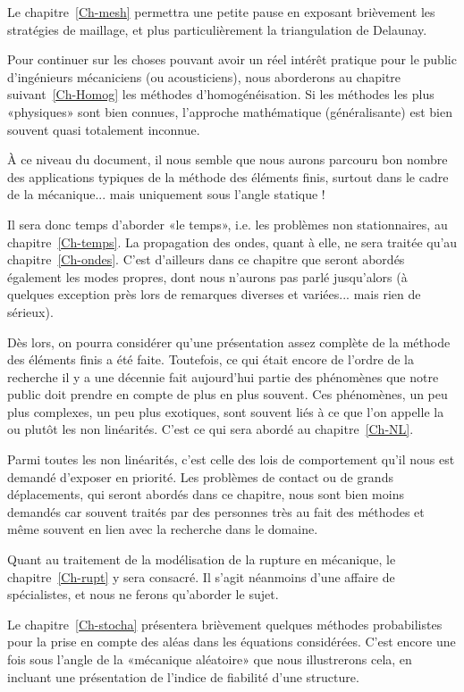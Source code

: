 \medskip
Le chapitre~\ref{Ch-mesh} permettra une petite pause en exposant brièvement les stratégies de maillage, et plus particulièrement la triangulation de Delaunay.

\medskip
Pour continuer sur les choses pouvant avoir un réel intérêt pratique pour le public d'ingénieurs mécaniciens (ou acousticiens), nous aborderons au chapitre suivant~\ref{Ch-Homog} les méthodes d'homogénéisation.
Si les méthodes les plus «physiques» sont bien connues, l'approche mathématique (généralisante) est bien souvent quasi totalement inconnue.

\medskip
À ce niveau du document, il nous semble que nous aurons parcouru bon nombre des applications typiques de la méthode des éléments finis, surtout dans le cadre de la mécanique... mais uniquement sous l'angle statique !

Il sera donc temps d'aborder «le temps», i.e. les problèmes non stationnaires, au chapitre~\ref{Ch-temps}.
La propagation des ondes, quant à elle, ne sera traitée qu'au chapitre~\ref{Ch-ondes}. C'est d'ailleurs dans ce chapitre que seront abordés également les modes propres, dont nous n'aurons pas parlé jusqu'alors (à quelques exception près lors de remarques diverses et variées... mais rien de sérieux).

\medskip
Dès lors, on pourra considérer qu'une présentation assez complète de la méthode des éléments finis a été faite. Toutefois, ce qui était encore de l'ordre de la recherche il y a une décennie fait aujourd'hui partie des phénomènes que notre public doit prendre en compte de plus en plus souvent. Ces phénomènes, un peu plus complexes, un peu plus exotiques, sont souvent liés à ce que l'on appelle la ou plutôt les non linéarités. C'est ce qui sera abordé au chapitre~\ref{Ch-NL}.

Parmi toutes les non linéarités, c'est celle des lois de comportement qu'il nous est demandé d'exposer en priorité. Les problèmes de contact ou de grands déplacements, qui seront abordés dans ce chapitre, nous sont bien moins demandés car souvent traités par des personnes très au fait des méthodes et même souvent en lien avec la recherche dans le domaine.

\medskip
Quant au traitement de la modélisation de la rupture en mécanique, le chapitre~\ref{Ch-rupt} y sera consacré. Il s'agit néanmoins d'une affaire de spécialistes, et nous ne ferons qu'aborder le sujet.

\medskip
Le chapitre~\ref{Ch-stocha} présentera brièvement quelques méthodes probabilistes pour la prise en compte des aléas dans les équations considérées. C'est encore une fois sous l'angle de la «mécanique aléatoire» que nous illustrerons cela, en incluant une présentation de l'indice de fiabilité d'une structure.

